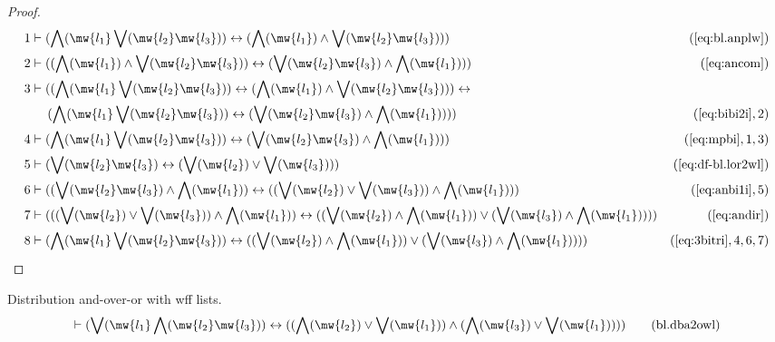 \begin{proof}
\begin{align}
  1 & \vdash ( \bigwedge( \mw{l_1} \bigvee( \mw{l_2} \mw{l_3} ) )
    \leftrightarrow ( \bigwedge( \mw{l_1} ) \wedge
    \bigvee( \mw{l_2} \mw{l_3} ) )
    )&(\mbox{\ref{eq:bl.anplw}})\notag
  \\ 2 & \vdash ( ( \bigwedge( \mw{l_1} ) \wedge \bigvee( \mw{l_2} \mw{l_3}
    ) ) \leftrightarrow ( \bigvee( \mw{l_2} \mw{l_3} )
    \wedge \bigwedge( \mw{l_1} ) )
    )&(\mbox{\ref{eq:ancom}})\notag
  \\ 3 & \vdash ( ( \bigwedge( \mw{l_1} \bigvee( \mw{l_2} \mw{l_3} ) )
    \leftrightarrow ( \bigwedge( \mw{l_1} ) \wedge
    \bigvee( \mw{l_2} \mw{l_3} ) ) ) \leftrightarrow\notag
    \\ & ~~~~(
    \bigwedge( \mw{l_1} \bigvee( \mw{l_2} \mw{l_3} ) )
    \leftrightarrow ( \bigvee( \mw{l_2} \mw{l_3} ) \wedge
    \bigwedge( \mw{l_1} ) ) )
    )&(\mbox{\ref{eq:bibi2i}},2)\notag
  \\ 4 & \vdash ( \bigwedge( \mw{l_1} \bigvee( \mw{l_2} \mw{l_3} ) )
    \leftrightarrow ( \bigvee( \mw{l_2} \mw{l_3} ) \wedge
    \bigwedge( \mw{l_1} ) )
    )&(\mbox{\ref{eq:mpbi}},1,3)\notag
  \\ 5 & \vdash ( \bigvee( \mw{l_2} \mw{l_3} ) \leftrightarrow ( \bigvee(
    \mw{l_2} ) \vee \bigvee( \mw{l_3} ) )
    )&(\mbox{\ref{eq:df-bl.lor2wl}})\notag
  \\ 6 & \vdash ( ( \bigvee( \mw{l_2} \mw{l_3} ) \wedge \bigwedge( \mw{l_1}
    ) ) \leftrightarrow ( ( \bigvee( \mw{l_2} ) \vee
    \bigvee( \mw{l_3} ) ) \wedge \bigwedge( \mw{l_1} ) )
    )&(\mbox{\ref{eq:anbi1i}},5)\notag
  \\ 7 & \vdash ( ( ( \bigvee( \mw{l_2} ) \vee \bigvee( \mw{l_3} ) ) \wedge
    \bigwedge( \mw{l_1} ) ) \leftrightarrow ( ( \bigvee(
    \mw{l_2} ) \wedge \bigwedge( \mw{l_1} ) ) \vee (
    \bigvee( \mw{l_3} ) \wedge \bigwedge( \mw{l_1} ) ) )
    )&(\mbox{\ref{eq:andir}})\notag
  \\ 8 & \vdash ( \bigwedge( \mw{l_1} \bigvee( \mw{l_2} \mw{l_3} ) )
    \leftrightarrow ( ( \bigvee( \mw{l_2} ) \wedge
    \bigwedge( \mw{l_1} ) ) \vee ( \bigvee( \mw{l_3} )
    \wedge \bigwedge( \mw{l_1} ) ) )
    )&(\mbox{\ref{eq:3bitri}},4,6,7)\notag
\end{align}
\end{proof}

\begin{lemma} Distribution and-over-or with wff lists.
\begin{align}
\vdash ( \bigvee( \mw{l_1} \bigwedge( \mw{l_2} \mw{l_3} ) ) \leftrightarrow ( (
    \bigwedge( \mw{l_2} ) \vee \bigvee( \mw{l_1} ) ) \wedge ( \bigwedge(
    \mw{l_3} ) \vee \bigvee( \mw{l_1} ) ) )
    )\label{eq:bl.dba2owl}\tag{bl.dba2owl}
\end{align}
\end{lemma}

